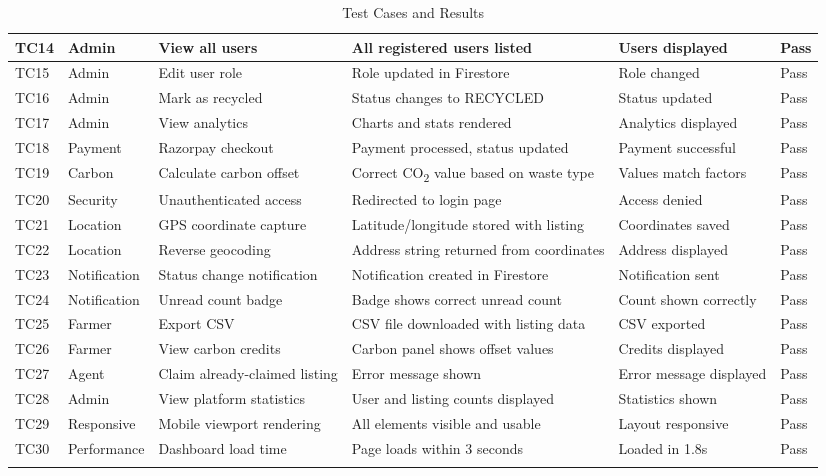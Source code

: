 \documentclass[a4paper,12pt,oneside]{report}
\begin{document}
\begin{longtable}{|C{0.9cm}|L{2.2cm}|L{2.6cm}|L{3.2cm}|L{3.2cm}|C{1.1cm}|}
\hline
TC14 & Admin & View all users & All registered users listed & Users displayed & Pass \\
\hline
TC15 & Admin & Edit user role & Role updated in Firestore & Role changed & Pass \\
\hline
TC16 & Admin & Mark as recycled & Status changes to RECYCLED & Status updated & Pass \\
\hline
TC17 & Admin & View analytics & Charts and stats rendered & Analytics displayed & Pass \\
\hline
TC18 & Payment & Razorpay checkout & Payment processed, status updated & Payment successful & Pass \\
\hline
TC19 & Carbon & Calculate carbon offset & Correct CO\textsubscript{2} value based on waste type & Values match factors & Pass \\
\hline
TC20 & Security & Unauthenticated access & Redirected to login page & Access denied & Pass \\
\hline
TC21 & Location & GPS coordinate capture & Latitude/longitude stored with listing & Coordinates saved & Pass \\
\hline
TC22 & Location & Reverse geocoding & Address string returned from coordinates & Address displayed & Pass \\
\hline
TC23 & Notification & Status change notification & Notification created in Firestore & Notification sent & Pass \\
\hline
TC24 & Notification & Unread count badge & Badge shows correct unread count & Count shown correctly & Pass \\
\hline
TC25 & Farmer & Export CSV & CSV file downloaded with listing data & CSV exported & Pass \\
\hline
TC26 & Farmer & View carbon credits & Carbon panel shows offset values & Credits displayed & Pass \\
\hline
TC27 & Agent & Claim already-claimed listing & Error message shown & Error message displayed & Pass \\
\hline
TC28 & Admin & View platform statistics & User and listing counts displayed & Statistics shown & Pass \\
\hline
TC29 & Responsive & Mobile viewport rendering & All elements visible and usable & Layout responsive & Pass \\
\hline
TC30 & Performance & Dashboard load time & Page loads within 3 seconds & Loaded in 1.8s & Pass \\
\hline
\caption{Test Cases and Results}
\label{tab:testcases}
\end{longtable}
\normalsize
\end{document}
